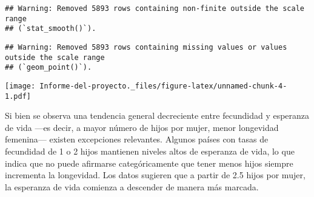 \documentclass[
]{article}
\begin{document}
\begin{verbatim}
## Warning: Removed 5893 rows containing non-finite outside the scale range
## (`stat_smooth()`).
\end{verbatim}

\begin{verbatim}
## Warning: Removed 5893 rows containing missing values or values outside the scale range
## (`geom_point()`).
\end{verbatim}

\texttt{[image: Informe-del-proyecto.\_files/figure-latex/unnamed-chunk-4-1.pdf]}

Si bien se observa una tendencia general decreciente entre fecundidad y
esperanza de vida ---es decir, a mayor número de hijos por mujer, menor
longevidad femenina--- existen excepciones relevantes. Algunos países
con tasas de fecundidad de 1 o 2 hijos mantienen niveles altos de
esperanza de vida, lo que indica que no puede afirmarse categóricamente
que tener menos hijos siempre incrementa la longevidad. Los datos
sugieren que a partir de 2.5 hijos por mujer, la esperanza de vida
comienza a descender de manera más marcada.
\end{document}
